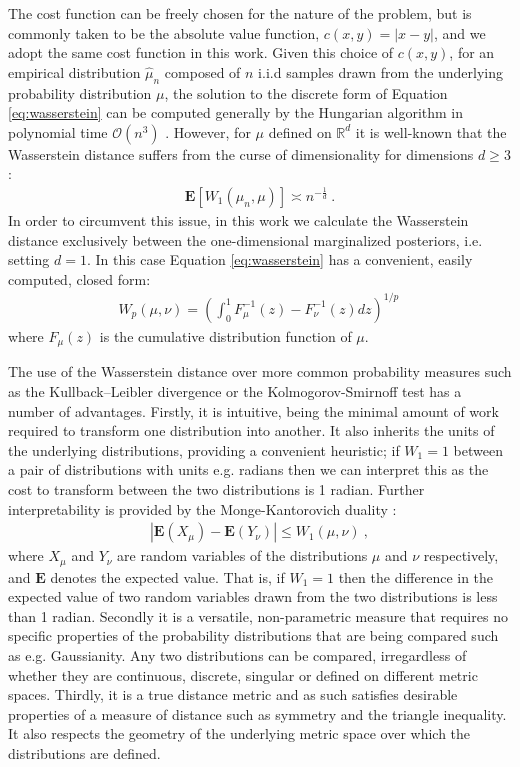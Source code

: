 \documentclass[fleqn,usenatbib,useAMS]{mnras}
\begin{document}
The cost function can be freely chosen for the nature of the problem, but is commonly taken to be the absolute value function, $c(x,y) = |x-y|$, and we adopt the same cost function in this work. Given this choice of $c(x,y)$, for an empirical distribution $\hat{\mu}_n$ composed of $n$ i.i.d samples drawn from the underlying probability distribution $\mu$, the solution to the discrete form of Equation \eqref{eq:wasserstein} can be computed generally by the Hungarian algorithm \citep{Kuhn} in polynomial time $\mathcal{O}(n^3)$ \citep{Villani2009}. However, for $\mu$ defined on $\mathbb{R}^d$ it is well-known \citep{Dudley} that the Wasserstein distance suffers from the curse of dimensionality for dimensions $d \geq 3$:
\begin{eqnarray}
	\boldsymbol{E} [W_1(\hat{\mu}_n,\mu)] \asymp n^{-\frac{1}{d}} \ .
\end{eqnarray}
In order to circumvent this issue, in this work we calculate the Wasserstein distance exclusively between the one-dimensional marginalized posteriors, i.e. setting $d=1$. In this case Equation \eqref{eq:wasserstein} has a convenient, easily computed, closed form:
\begin{eqnarray}
	W_p(\mu,\nu)= \left(\int_0^1  F_{\mu}^{-1} (z) - F_{\nu}^{-1} (z) dz \right)^{1/p} \, \label{eq:wasserstein}
\end{eqnarray}
where $F_{\mu}(z)$ is the cumulative distribution function of $\mu$. \newline  


The use of the Wasserstein distance over more common probability measures such as the Kullback–Leibler divergence or the  Kolmogorov-Smirnoff test has a number of advantages. Firstly, it is intuitive, being the minimal amount of work required to transform one distribution into another. It also inherits the units of the underlying distributions, providing a convenient heuristic; if $W_1 =1$ between a pair of distributions with units e.g. radians then we can interpret this as the cost to transform between the two distributions is 1 radian. Further interpretability is provided by the Monge-Kantorovich duality \citep{villani2003topics,Villani2009}:
\begin{eqnarray}
	| \boldsymbol{E}(X_{\mu} )-\boldsymbol{E}(Y_{\nu} ) | \leq W_1(\mu, \nu) \ , \label{eq:WDdefn}
\end{eqnarray}
where $X_{\mu}$ and $Y_{\nu}$ are random variables of the distributions $\mu$ and $\nu$ respectively, and $\boldsymbol{E}$ denotes the expected value. That is, if $W_1 =1$ then the difference in the expected value of two random variables drawn from the two distributions is less than 1 radian. Secondly it is a versatile, non-parametric measure that requires no specific properties of the probability distributions that are being compared such as e.g. Gaussianity. Any two distributions can be compared, irregardless of whether they are continuous, discrete, singular or defined on different metric spaces. Thirdly, it is a true distance metric and as such satisfies desirable properties of a measure of distance such as symmetry and the triangle inequality. It also respects the geometry of the underlying metric space over which the distributions are defined. \newline   
\end{document}
